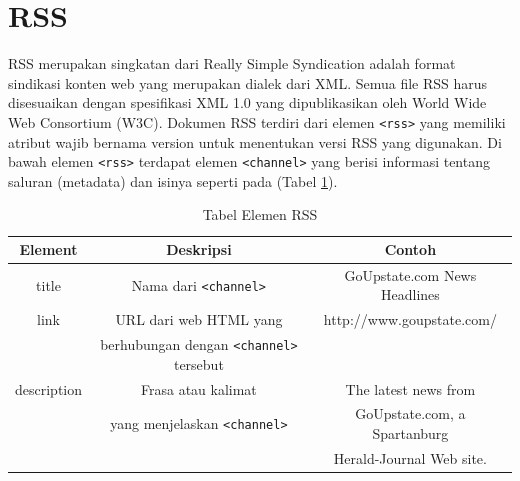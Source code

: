 \section{RSS}
RSS merupakan singkatan dari Really Simple Syndication adalah format sindikasi konten web yang merupakan dialek dari XML. Semua file RSS harus disesuaikan dengan spesifikasi XML 1.0 yang dipublikasikan oleh World Wide Web Consortium (W3C). Dokumen RSS terdiri dari elemen \texttt{<rss>} yang memiliki atribut wajib bernama version untuk menentukan versi RSS yang digunakan. Di bawah elemen \texttt{<rss>} terdapat elemen \texttt{<channel>} yang berisi informasi tentang saluran (metadata) dan isinya seperti pada (Tabel \ref{tab:elemen-rss}).
\begin{table} [H]
    \centering
    \caption{Tabel Elemen RSS}
    \begin{tabular}{|c|c|c|}
    \hline
       Element & Deskripsi & Contoh  \\ \hline
        title &  Nama dari \texttt{<channel>} & GoUpstate.com News Headlines \\ \hline
        link & URL dari web HTML yang & http://www.goupstate.com/ \\
        & berhubungan dengan \texttt{<channel>} tersebut & \\ \hline
        description & Frasa atau kalimat & The latest news from  \\ 
        & yang menjelaskan \texttt{<channel>} & GoUpstate.com, a Spartanburg \\ 
        & &  Herald-Journal Web site.\\ \hline
    \end{tabular}
    \label{tab:elemen-rss}
\end{table}


